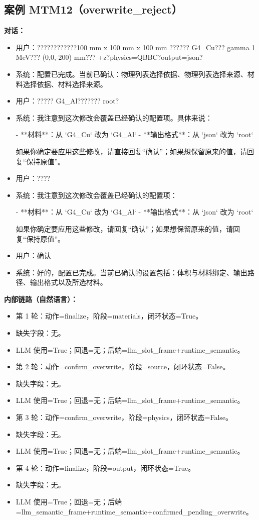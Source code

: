 \documentclass[11pt]{ctexart}
\begin{document}
\subsection{案例 MTM12（overwrite\_reject）}
\textbf{对话：}
\begin{itemize}
\item 用户：????????????100 mm x 100 mm x 100 mm ?????? G4\_Cu??? gamma 1 MeV??? (0,0,-200) mm??? +z?physics=QBBC?output=json?
\item 系统：配置已完成。当前已确认：物理列表选择依据、物理列表选择来源、材料选择依据、材料选择来源。
\item 用户：????? G4\_Al??????? root?
\item 系统：我注意到这次修改会覆盖已经确认的配置项。具体来说：

- **材料**：从 `G4\_Cu` 改为 `G4\_Al`
- **输出格式**：从 `json` 改为 `root`

如果你确定要应用这些修改，请直接回复“确认”；如果想保留原来的值，请回复“保持原值”。
\item 用户：????
\item 系统：我注意到这次修改会覆盖已经确认的配置项：

- **材料**：从 `G4\_Cu` 改为 `G4\_Al`
- **输出格式**：从 `json` 改为 `root`

如果你确定要应用这些修改，请回复“确认”；如果想保留原来的值，请回复“保持原值”。
\item 用户：确认
\item 系统：好的，配置已完成。当前已确认的设置包括：体积与材料绑定、输出路径、输出格式以及所选材料。
\end{itemize}
\textbf{内部链路（自然语言）：}
\begin{itemize}
\item 第 1 轮：动作=finalize，阶段=materials，闭环状态=True。
\item 缺失字段：无。
\item LLM 使用=True；回退=无；后端=llm\_slot\_frame+runtime\_semantic。
\item 第 2 轮：动作=confirm\_overwrite，阶段=source，闭环状态=False。
\item 缺失字段：无。
\item LLM 使用=True；回退=无；后端=llm\_slot\_frame+runtime\_semantic。
\item 第 3 轮：动作=confirm\_overwrite，阶段=physics，闭环状态=False。
\item 缺失字段：无。
\item LLM 使用=True；回退=无；后端=llm\_slot\_frame+runtime\_semantic。
\item 第 4 轮：动作=finalize，阶段=output，闭环状态=True。
\item 缺失字段：无。
\item LLM 使用=True；回退=无；后端=llm\_semantic\_frame+runtime\_semantic+confirmed\_pending\_overwrite。
\end{itemize}
\end{document}
